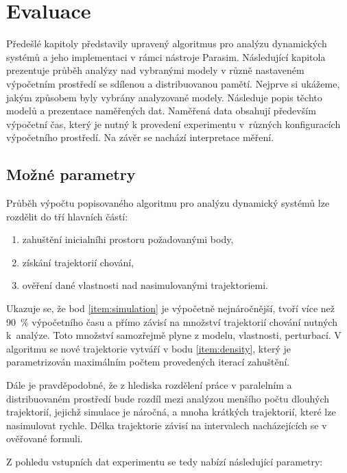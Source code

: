 \chapter{Evaluace}\label{chapter:evaluation}

Předešlé kapitoly představily upravený algoritmus pro analýzu dy\-na\-mic\-kých systémů
a jeho implementaci v rámci nástroje Parasim. Následující kapitola prezentuje průběh 
analýzy nad vybranými modely v různě nastaveném výpočetním prostředí se sdílenou a distribuovanou pamětí.
Nejprve si ukážeme, jakým způsobem byly vybrány analyzované modely. Následuje popis těchto modelů
a prezentace naměřených dat. Na\-mě\-ře\-ná data obsahují především
výpočetní čas, který je nutný k provedení experimentu v~růz\-ných konfiguracích výpočetního
prostředí. Na závěr se nachází interpretace mě\-ře\-ní.

\section{Možné parametry}

Průběh výpočtu popisovaného algoritmu pro analýzu dynamický systémů lze rozdělit do tří hlavních částí:

\begin{enumerate}
	\item	zahuštění inicialníhi prostoru požadovanými body, \label{item:density}
	\item	získání trajektorií chování,\label{item:simulation}
	\item	ověření dané vlastnosti nad nasimulovanými trajektoriemi. 
\end{enumerate}

Ukazuje se, že bod \ref{item:simulation} je výpočetně nejnáročnější, tvoří více než 90~\% výpočetního času a přímo závisí na 
množství  trajektorií chování nutných k~analýze. Toto množství samozřejmě plyne z modelu, vlastnosti, perturbací.
V algoritmu se nové trajektorie vytváří v bodu \ref{item:density}, který je parametrizován maximálním
počtem provedených iterací zahuštění.

Dále je pravděpodobné, že z hlediska roz\-dě\-le\-ní práce v paralelním a distribuovaném
prostředí bude rozdíl mezi analýzou menšího počtu dlouhých trajektorií, jejichž simulace
je náročná, a mnoha krátkých trajektorií, které lze nasimulovat rychle. Délka trajektorie
závisí na intervalech nacházejících se v ověřované formuli. 

Z pohledu vstupních dat experimentu se tedy nabízí následující parametry:


